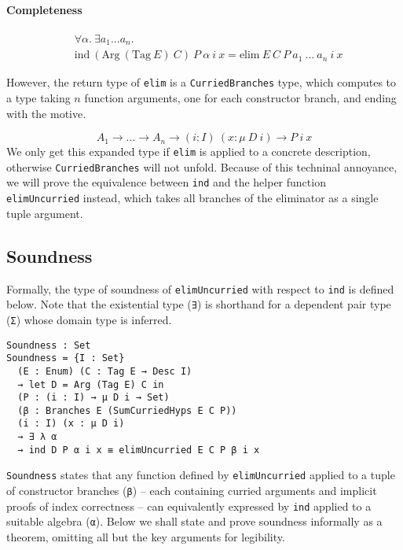 \documentclass[preprint,nonatbib]{sigplanconf}
\begin{document}
\paragraph{Completeness}

\begin{align*}
&\forall \alpha. ~ \exists a_1 ... a_n. \\
&\textrm{ind} ~ (\textrm{Arg} ~ (\textrm{Tag} ~ E) ~ C) ~ P ~ \alpha ~ i ~ x =
\textrm{elim} ~ E ~ C ~ P ~ a_1 ~ ... ~ a_n ~ i ~ x
\end{align*}

However, the return type of {\tt elim} is a {\tt CurriedBranches} type,
which computes to a type taking $n$ function arguments, 
one for each constructor branch,
and ending with the motive.

\[
A_1 → ... → A_n → (i : I) ~ (x : \mu ~ D ~ i) → P ~ i ~ x
\]
\linebreak
We only get this expanded type if {\tt elim} is applied to a concrete
description, otherwise {\tt CurriedBranches} will not unfold. Because
of this techninal annoyance, we will prove the equivalence between
{\tt ind} and the helper function {\tt elimUncurried} instead, which
takes all branches of the eliminator as a single tuple argument.

\subsection{Soundness}

Formally, the type of soundness of {\tt elimUncurried} with respect to
{\tt ind} is defined below.
Note that the existential type ({\tt ∃}) is
shorthand for a dependent pair type ({\tt Σ}) whose domain type is
inferred.

\begin{verbatim}
Soundness : Set
Soundness = {I : Set}
  (E : Enum) (C : Tag E → Desc I)
  → let D = Arg (Tag E) C in
  (P : (i : I) → μ D i → Set)
  (β : Branches E (SumCurriedHyps E C P))
  (i : I) (x : μ D i)
  → ∃ λ α
  → ind D P α i x ≡ elimUncurried E C P β i x
\end{verbatim}

{\tt Soundness} states that any function defined by
{\tt elimUncurried} applied to a tuple of constructor branches
({\tt β}) --
each containing curried arguments and implicit proofs of index
correctness -- can equivalently expressed by {\tt ind} applied to a
suitable algebra ({\tt α}). Below we shall state and prove soundness informally
as a theorem, omitting all but the key arguments for legibility.
\end{document}
